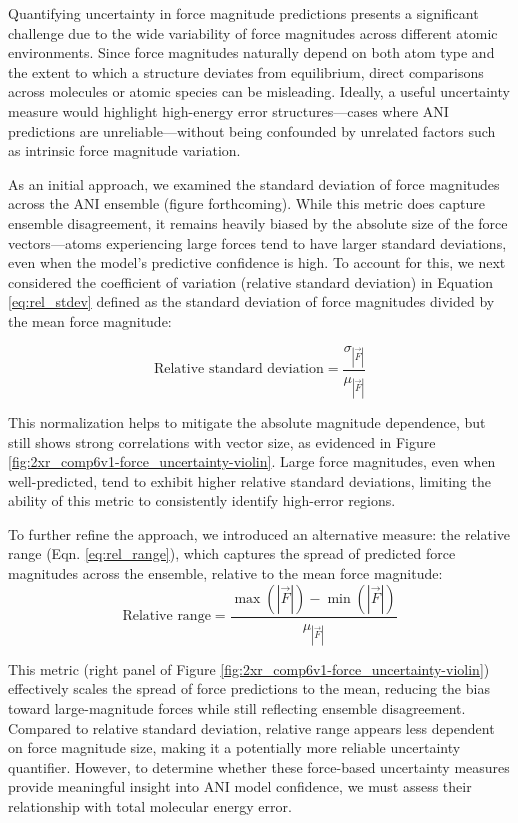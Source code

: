 Quantifying uncertainty in force magnitude predictions presents a significant challenge due to the wide variability of force magnitudes across different atomic environments. Since force magnitudes naturally depend on both atom type and the extent to which a structure deviates from equilibrium, direct comparisons across molecules or atomic species can be misleading. Ideally, a useful uncertainty measure would highlight high-energy error structures—cases where ANI predictions are unreliable—without being confounded by unrelated factors such as intrinsic force magnitude variation.

As an initial approach, we examined the standard deviation of force magnitudes across the ANI ensemble (figure forthcoming). While this metric does capture ensemble disagreement, it remains heavily biased by the absolute size of the force vectors—atoms experiencing large forces tend to have larger standard deviations, even when the model’s predictive confidence is high. To account for this, we next considered the coefficient of variation (relative standard deviation) in Equation \ref{eq:rel_stdev} defined as the standard deviation of force magnitudes divided by the mean force magnitude:

\begin{equation} 
\text{Relative standard deviation} = \frac{\sigma_{|\vec{F}|}}{\mu_{|\vec{F}|}}
\label{eq:rel_stdev}
\end{equation}

This normalization helps to mitigate the absolute magnitude dependence, but still shows strong correlations with vector size, as evidenced in Figure \ref{fig:2xr_comp6v1-force_uncertainty-violin}. Large force magnitudes, even when well-predicted, tend to exhibit higher relative standard deviations, limiting the ability of this metric to consistently identify high-error regions.

To further refine the approach, we introduced an alternative measure: the relative range (Eqn. \ref{eq:rel_range}), which captures the spread of predicted force magnitudes across the ensemble, relative to the mean force magnitude:
\begin{equation} 
\text{Relative range} = \frac{\max(|\vec{F}|) - \min(|\vec{F}|)}{\mu_{|\vec{F}|}} 
\label{eq:rel_range}
\end{equation}

This metric (right panel of Figure \ref{fig:2xr_comp6v1-force_uncertainty-violin}) effectively scales the spread of force predictions to the mean, reducing the bias toward large-magnitude forces while still reflecting ensemble disagreement. Compared to relative standard deviation, relative range appears less dependent on force magnitude size, making it a potentially more reliable uncertainty quantifier.
However, to determine whether these force-based uncertainty measures provide meaningful insight into ANI model confidence, we must assess their relationship with total molecular energy error. 

